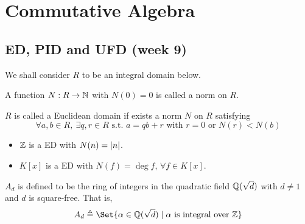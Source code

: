 \section{Commutative Algebra}

\subsection{ED, PID and UFD (week 9)}

We shall consider $R$ to be an integral domain below.
\begin{definition}
  A function $N: R \to \mathbb{N}$ with $N(0) = 0$ is called a norm on $R$.
\end{definition}

\begin{definition}
  $R$ is called a Euclidean domain if exists a norm $N$ on $R$
  satisfying
  \[ \forall a, b \in R, \ \exists q, r \in R \text{ s.t. }
  a = qb + r \text{ with } r = 0 \text{ or } N(r) < N(b) \]
\end{definition}

\begin{example} \hfill
  \begin{itemize}
    \item $\mathbb{Z}$ is a ED with $N(n) = \lvert n\rvert$.
    \item $K[x]$ is a ED with $N(f) = \deg f, \, \forall f \in K[x]$.
  \end{itemize}
\end{example}

\begin{definition}
  $A_d$ is defined to be the ring of integers in the quadratic field $\mathbb{Q}(\sqrt{d})$
  with $d \neq 1$ and $d$ is square-free. That is,
  \[ A_d \triangleq \Set{ \alpha \in \Qb(\sqrt{d}) \mid \alpha \text{ is integral over } \Zb} \]
\end{definition}

